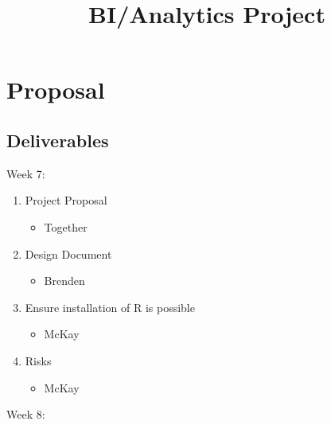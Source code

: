 \documentclass[]{article}
\title{BI/Analytics Project}
\author{}
\date{}
\providecommand{\tightlist}{%
  \setlength{\itemsep}{0pt}\setlength{\parskip}{0pt}}
\begin{document}
\maketitle

\hypertarget{proposal}{%
\section{Proposal}\label{proposal}}

\hypertarget{deliverables}{%
\subsection{Deliverables}\label{deliverables}}

Week 7:

\begin{enumerate}
\def\labelenumi{\arabic{enumi}.}
\tightlist
\item
  Project Proposal

  \begin{itemize}
  \tightlist
  \item
    Together
  \end{itemize}
\item
  Design Document

  \begin{itemize}
  \tightlist
  \item
    Brenden
  \end{itemize}
\item
  Ensure installation of R is possible

  \begin{itemize}
  \tightlist
  \item
    McKay
  \end{itemize}
\item
  Risks

  \begin{itemize}
  \tightlist
  \item
    McKay
  \end{itemize}
\end{enumerate}

Week 8:
\end{document}
